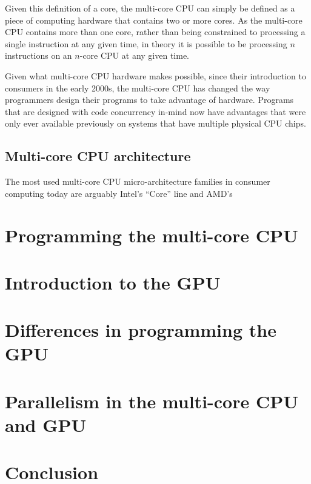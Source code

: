 \documentclass[a4paper,11pt]{article}
\begin{document}
Given this definition of a core, the multi-core CPU can simply be defined as a piece of computing hardware that contains
two or more cores. As the multi-core CPU contains more than one core, rather than being constrained to processing a single
instruction at any given time, in theory it is possible to be processing $n$ instructions on an $n$-core CPU at any given time.

Given what multi-core CPU hardware makes possible, since their introduction to consumers in the early 2000s, the multi-core
CPU has changed the way programmers design their programs to take advantage of hardware. Programs that are designed with
code concurrency in-mind now have advantages that were only ever available previously on systems that have multiple physical
CPU chips.

\subsection{Multi-core CPU architecture} %
\label{sub:multi_core_cpu_architecture}
The most used multi-core CPU micro-architecture families in consumer computing today are arguably Intel's ``Core'' line
and AMD's





\section{Programming the multi-core CPU} %
\label{sec:programming_the_multi_core_cpu}



\section{Introduction to the GPU} %
\label{sec:introduction_to_the_gpu}



\section{Differences in programming the GPU} %
\label{sec:differences_in_programming_the_gpu}



\section{Parallelism in the multi-core CPU and GPU} %
\label{sec:parallelism_in_the_multi_core_cpu_and_gpu}



\section{Conclusion} %
\label{sec:conclusion}





\end{document}

